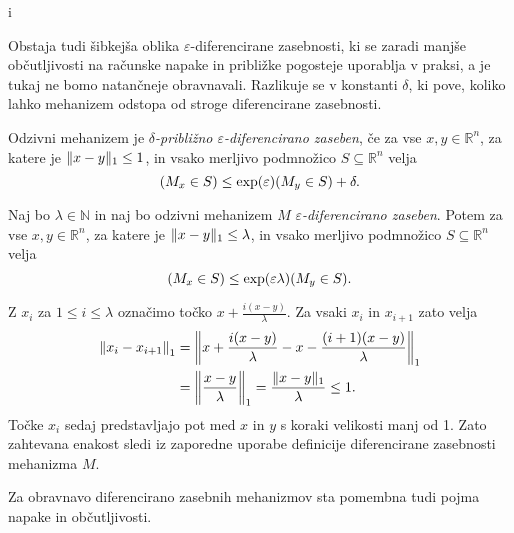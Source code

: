 i\documentclass[mat1]{fmfdelo}
\DeclarePairedDelimiter{\norm}{\lVert}{\rVert}
\newcommand{\R}{\mathbb R}
\newcommand{\N}{\mathbb N}
\let\P\relax \DeclareMathOperator*{\P}{\mathbb P}
\begin{document}
Obstaja tudi šibkejša oblika $\varepsilon$-diferencirane zasebnosti, ki se zaradi manjše ob\-čutljivosti na računske napake in približke pogosteje uporablja v praksi, a je tukaj ne bomo natančneje obravnavali. Razlikuje se v konstanti $\delta$, ki pove, koliko lahko mehanizem odstopa od stroge diferencirane zasebnosti.

\begin{definicija}
	Odzivni mehanizem je {\em $\delta$-približno $\varepsilon$-diferencirano zaseben}, če za vse $x,y \in \R^n$, za katere je $\norm{x-y}_1 \leq 1$, in vsako merljivo podmnožico $S \subseteq \R^n$ velja
	\begin{equation*}
	    \P(M_x \in S) \leq \exp(\varepsilon) \P(M_y \in S) + \delta.
	\end{equation*}
\end{definicija}

\begin{trditev} \label{group}
    	Naj bo $\lambda \in \N$ in naj bo odzivni mehanizem $M$ {\em $\varepsilon$-diferencirano zaseben}. Potem za vse $x,y \in \R^n$, za katere je $\norm{x-y}_1 \leq \lambda$, in vsako merljivo podmnožico $S \subseteq \R^n$ velja
	\begin{equation*}
	    \P(M_x \in S) \leq \exp(\varepsilon \lambda) \P(M_y \in S).
	\end{equation*}
\end{trditev}
\begin{dokaz}
    Z $x_i$ za $1 \leq i \leq \lambda$ označimo točko $x+\frac{i(x-y)}{\lambda}$. Za vsaki $x_i$ in $x_{i+1}$ zato velja
    \begin{align*}
        \norm*{x_i - x_{i+1}}_1 &= \norm*{x+\frac{i(x-y)}{\lambda} - x - \frac{(i+1)(x-y)}{\lambda}}_1 \\
        &= \norm*{\frac{x-y}{\lambda}}_1 = \frac{\norm{x-y}_1}{\lambda} \leq 1.
    \end{align*}
    Točke $x_i$ sedaj predstavljajo pot med $x$ in $y$ s koraki velikosti manj od 1. Zato zahtevana enakost sledi iz zaporedne uporabe definicije diferencirane zasebnosti mehanizma $M$.
\end{dokaz}

Za obravnavo diferencirano zasebnih mehanizmov sta pomembna tudi pojma napake in občutljivosti.
\end{document}
